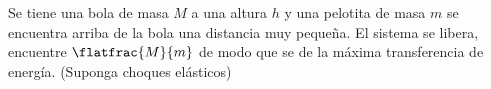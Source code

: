 \begin{mdframed}[style=warning]
	\begin{ejercicio}
		Se tiene una bola de masa $M$ a una altura $h$ y una pelotita de masa $m$ se encuentra arriba de la bola una distancia muy pequeña. El sistema se libera, encuentre $\flatfrac{M}{m}$ de modo que se de la máxima transferencia de energía. (Suponga choques elásticos)
	\end{ejercicio}
\end{mdframed}


































































































